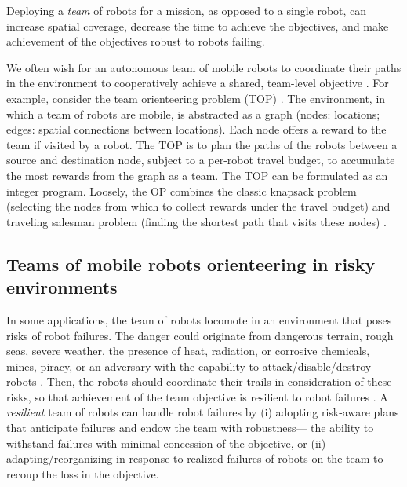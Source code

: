 \documentclass[11pt, oneside]{article}
\begin{document}
Deploying a \emph{team} of robots for a mission, as opposed to a single robot, can increase spatial coverage, decrease the time to achieve the objectives, and make achievement of the objectives robust to robots failing.

We often wish for an autonomous team of mobile robots to coordinate their paths in the environment to cooperatively achieve a shared, team-level objective \cite{parker2007distributed,lesser1999cooperative}.
For example, consider the team orienteering problem (TOP) \cite{gunawan2016orienteering,vansteenwegen2011orienteering}. 
The environment, in which a team of robots are mobile, is abstracted as a graph (nodes: locations; edges: spatial connections between locations). Each node offers a reward to the team if visited by a robot.
The TOP is to plan the paths of the robots between a source and destination node, subject to a per-robot travel budget, to accumulate the most rewards from the graph as a team. The TOP can be formulated as an integer program. Loosely, the OP combines the classic knapsack problem (selecting the nodes from which to collect rewards under the travel budget) and traveling salesman problem (finding the shortest path that visits these nodes) \cite{vansteenwegen2011orienteering}.

\subsection{Teams of mobile robots orienteering in risky environments} 
In some applications, the team of robots locomote in an environment that poses risks of robot failures. 
The danger could originate from dangerous terrain, rough seas, severe weather, the presence of heat, radiation, or corrosive chemicals, mines, piracy, or an adversary with the capability to attack/disable/destroy robots \cite{agmon2017robotic}. Then, the robots should coordinate their trails in consideration of these risks, so that achievement of the team objective is resilient to robot failures \cite{zhou2021multi}. 
A \emph{resilient} team of robots \cite{prorok2021beyond} can handle robot failures by 
(i)
adopting risk-aware plans that anticipate failures and endow the team with robustness--- the ability to withstand failures with minimal concession of the objective,
or
(ii) adapting/reorganizing in response to realized failures of robots on the team to recoup the loss in the objective. 
\end{document}
